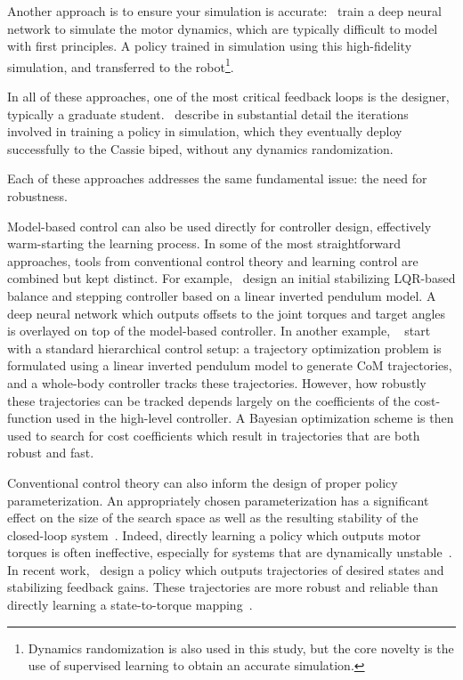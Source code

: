 Another approach is to ensure your simulation is accurate:~\textcite{hwangbo2019learning} train a deep neural network to simulate the motor dynamics, which are typically difficult to model with first principles. A policy trained in simulation using this high-fidelity simulation, and transferred to the robot\footnote{Dynamics randomization is also used in this study, but the core novelty is the use of supervised learning to obtain an accurate simulation.}. \par
In all of these approaches, one of the most critical feedback loops is the designer, typically a graduate student.~\textcite{xie2019cassie} describe in substantial detail the iterations involved in training a policy in simulation, which they eventually deploy successfully to the Cassie biped, without any dynamics randomization. \par
Each of these approaches addresses the same fundamental issue: the need for robustness. \par
Model-based control can also be used directly for controller design, effectively warm-starting the learning process. In some of the most straightforward approaches, tools from conventional control theory and learning control are combined but kept distinct. For example,~\textcite{kumar2018improving} design an initial stabilizing LQR-based balance and stepping controller based on a linear inverted pendulum model. A deep neural network which outputs offsets to the joint torques and target angles is overlayed on top of the model-based controller.
In another example, ~\textcite{yeganegi2019robust} start with a standard hierarchical control setup: a trajectory optimization problem is formulated using a linear inverted pendulum model to generate CoM trajectories, and a whole-body controller tracks these trajectories. However, how robustly these trajectories can be tracked depends largely on the coefficients of the cost-function used in the high-level controller. A Bayesian optimization scheme is then used to search for cost coefficients which result in trajectories that are both robust and fast. \par
Conventional control theory can also inform the design of proper policy parameterization. An appropriately chosen parameterization has a significant effect on the size of the search space as well as the resulting stability of the closed-loop system~\cite{roberts2011feedback}. Indeed, directly learning a policy which outputs motor torques is often ineffective, especially for systems that are dynamically unstable~\cite{peng2017learning}. In recent work,~\textcite{viereck2018learning} design a policy which outputs trajectories of desired states and stabilizing feedback gains. These trajectories are more robust and reliable than directly learning a state-to-torque mapping~\cite{viereck2018learning}.
